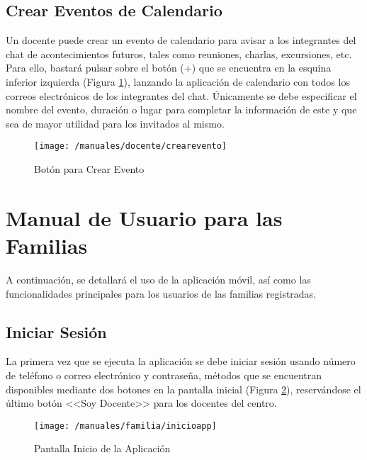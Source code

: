 \subsection*{Crear Eventos de Calendario}
Un docente puede crear un evento de calendario para avisar a los integrantes del chat de acontecimientos futuros, tales como reuniones, charlas, excursiones, etc. Para ello, bastará pulsar sobre el botón (+) que se encuentra en la esquina inferior izquierda (Figura \ref{fig:creareventodocente}), lanzando la aplicación de calendario con todos los correos electrónicos de los integrantes del chat. Únicamente se debe especificar el nombre del evento, duración o lugar para completar la información de este y que sea de mayor utilidad para los invitados al mismo.

\begin{figure}[!h]
	\begin{center}
		\texttt{[image: /manuales/docente/crearevento]}
		\caption{Botón para Crear Evento}
		\label{fig:creareventodocente}
	\end{center}
\end{figure}

\section*{Manual de Usuario para las Familias}
A continuación, se detallará el uso de la aplicación móvil, así como las funcionalidades principales para los usuarios de las familias registradas.

\subsection*{Iniciar Sesión}
La primera vez que se ejecuta la aplicación se debe iniciar sesión usando número de teléfono o correo electrónico y contraseña, métodos que se encuentran disponibles mediante dos botones en la pantalla inicial (Figura \ref{fig:inicioappfamilia}), reservándose el último botón <<Soy Docente>> para los docentes del centro.

\begin{figure}[!h]
	\begin{center}
		\texttt{[image: /manuales/familia/inicioapp]}
		\caption{Pantalla Inicio de la Aplicación}
		\label{fig:inicioappfamilia}
	\end{center}
\end{figure}

\clearpage

